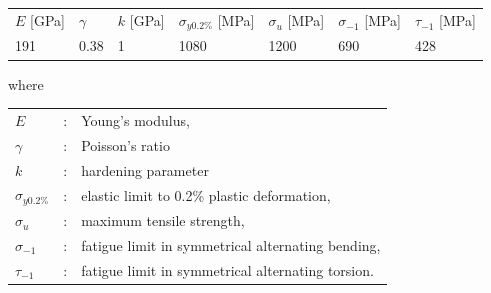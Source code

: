 \documentclass[3p,times,number,review]{elsarticle}
\begin{document}
\begin{table}[!h]
	\centering
	\begin{tabular}{lllllll}
		\hline
		 $E$ [GPa] &   $\gamma$& $k$ [GPa] & $\sigma_{y0.2\%}$ [MPa]  & $\sigma_u$ [MPa] & $\sigma_{-1}$  [MPa] & $\tau_{-1}$  [MPa] \\
		191      & 0.38                  & 1    & 1080    & 1200        & 690         & 428                \\ \hline
	\end{tabular}
	\label{tab:30NCD16}
\end{table}
where
\begin{table}[!h]
	\centering
	\begin{tabular}{lll}
		$E$ & : & Young's modulus,       \\
		$\gamma$ & : & Poisson's ratio  \\
		$k$ & : & hardening parameter  \\
		$\sigma_{y0.2\%}$  & : & elastic limit to 0.2\% plastic deformation,       \\
	$\sigma_u$         & : & maximum tensile strength,                         \\
		$\sigma_{-1}$ & : & fatigue limit in symmetrical alternating bending, \\
		$\tau_{-1}$   & : & fatigue limit in symmetrical alternating torsion.
	\end{tabular}
\end{table}
\end{document}
